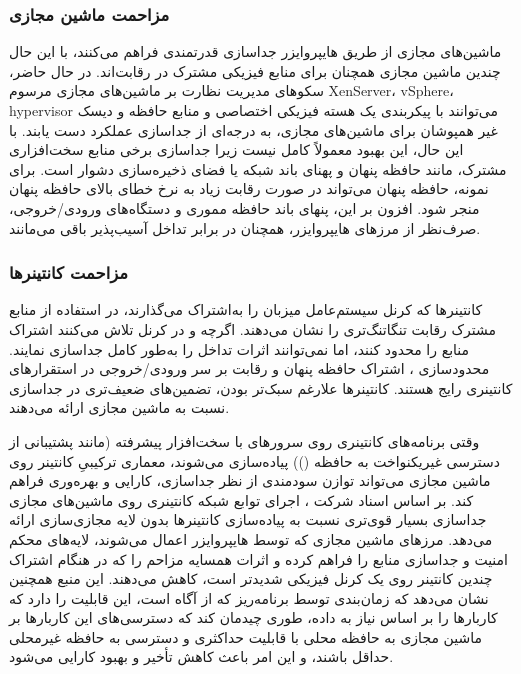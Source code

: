 \subsubsection{مزاحمت ماشین مجازی}

ماشین‌های مجازی از طریق هایپروایزر جداسازی قدرتمندی فراهم می‌کنند، با این حال چندین ماشین مجازی همچنان برای منابع فیزیکی مشترک در رقابت‌اند. در حال حاضر، سکوهای مدیریت نظارت بر ماشین‌های مجازی مرسوم XenServer، vSphere، hypervisor می‌توانند با پیکربندی یک هسته فیزیکی اختصاصی و منابع حافظه و دیسک غیر همپوشان برای ماشین‌های مجازی، به درجه‌ای از جداسازی عملکرد دست یابند\cite{barham2003xen}. با این حال، این بهبود معمولاً کامل نیست زیرا جداسازی برخی منابع سخت‌افزاری مشترک، مانند حافظه پنهان و پهنای باند شبکه یا فضای ذخیره‌سازی دشوار است. برای نمونه، حافظه پنهان  می‌تواند در صورت رقابت زیاد به نرخ خطای بالای حافظه پنهان منجر شود. افزون بر این، پنهای باند حافظه مموری و دستگاه‌های ورودی/خروجی، صرف‌نظر از مرزهای هایپروایزر، همچنان در برابر تداخل آسیب‌پذیر باقی می‌مانند.

\subsubsection{مزاحمت کانتینر‌ها}

کانتینرها که کرنل سیستم‌عامل میزبان را به‌اشتراک می‌گذارند، در استفاده از منابع مشترک رقابت تنگاتنگ‌تری را نشان می‌دهند. اگرچه  و  در کرنل تلاش می‌کنند اشتراک منابع را محدود کنند، اما نمی‌توانند اثرات تداخل را به‌طور کامل جداسازی نمایند. محدودسازی ، اشتراک حافظه پنهان و رقابت بر سر ورودی/خروجی در استقرارهای کانتینری  رایج هستند. کانتینرها علارغم سبک‌تر بودن، تضمین‌های ضعیف‌تری در جداسازی نسبت به ماشین مجازی ارائه می‌دهند.

وقتی برنامه‌های کانتینری روی سرورهای  با سخت‌افزار پیشرفته (مانند پشتیبانی از دسترسی غیریکنواخت به حافظه ()) پیاده‌سازی می‌شوند، معماری ترکیبیِ کانتینر روی ماشین مجازی می‌تواند توازن سودمندی از نظر جداسازی، کارایی و بهره‌وری  فراهم کند. بر اساس اسناد شرکت ، اجرای توابع شبکه کانتینری روی ماشین‌های مجازی جداسازی بسیار قوی‌تری نسبت به پیاده‌سازی کانتینرها بدون لایه مجازی‌سازی ارائه می‌دهد\cite{vmware_whitepaper}. مرزهای ماشین مجازی که توسط هایپروایزر اعمال می‌شوند، لایه‌های محکم امنیت و جداسازی منابع را فراهم کرده و اثرات همسایه مزاحم را که در هنگام اشتراک چندین کانتینر روی یک کرنل فیزیکی شدیدتر است، کاهش می‌دهند. این منبع همچنین نشان می‌دهد که زمان‌بندی  توسط برنامه‌ریز  که از   آگاه است، این قابلیت را دارد که کاربارها را بر اساس نیاز به داده، طوری چیدمان کند که دسترسی‌های این کاربارها بر ماشین‌ مجازی به حافظه محلی با قابلیت  حداکثری و دسترسی به حافظه غیرمحلی حداقل باشند، و این امر باعث کاهش تأخیر و بهبود کارایی می‌شود.

